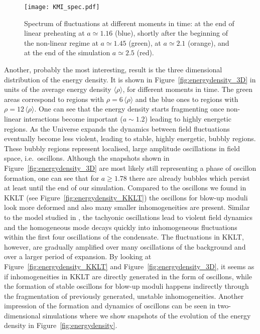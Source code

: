 \documentclass[12pt]{article}
\begin{document}
\begin{figure}
\begin{center}\texttt{[image: KMI\_spec.pdf]}
\end{center}
\caption{Spectrum of fluctuations at different moments in time: at the end of linear preheating at $a\simeq1.16$ (blue), shortly after the beginning of the non-linear regime at $a\simeq1.45$ (green), at $a\simeq2.1$ (orange), and at the end of the simulation $a\simeq2.5$ (red).}
\label{fig:KMI_spec}
\end{figure}

Another, probably the most interesting, result is the three dimensional distribution of the energy density. It is shown in Figure~\ref{fig:energydensity_3D} in units of the average energy density $\langle\rho\rangle$, for different moments in time. The green areas correspond to regions with $\rho = 6\,\langle\rho\rangle$ and the blue ones to regions with $\rho = 12\,\langle\rho\rangle$. One can see that the energy density starts fragmenting once non-linear interactions become important ($a\sim1.2$) leading to highly energetic regions. As the Universe expands the dynamics between field fluctuations eventually become less violent, leading to stable, highly energetic, bubbly regions. These bubbly regions represent localised, large amplitude oscillations in field space, i.e.\ oscillons. Although the snapshots shown in Figure~\ref{fig:energydensity_3D} are most likely still representing a phase of oscillon formation, one can see that for $a\ge1.78$ there are already bubbles which persist at least until the end of our simulation. 
Compared to the oscillons we found in KKLT (see Figure~\ref{fig:energydensity_KKLT}) the oscillons for blow-up moduli look more deformed and also many smaller inhomogeneities are present. Similar to the model studied in \cite{Antusch:2016con}, the tachyonic oscillations lead to violent field dynamics and the homogeneous mode decays quickly into inhomogeneous fluctuations within the first four oscillations of the condensate. 
The fluctuations in KKLT, however, are gradually amplified over many oscillations of the background and over a larger period of expansion. By looking at Figure~\ref{fig:energydensity_KKLT} and Figure~\ref{fig:energydensity_3D}, it seems as if inhomogeneities in KKLT are directly generated in the form of oscillons, while the formation of stable oscillons for blow-up moduli happens indirectly through the fragmentation of previously generated, unstable inhomogeneities.
Another impression of the formation and dynamics of oscillons can be seen in two-dimensional simulations where we show snapshots of the evolution of the energy density in Figure~\ref{fig:energydensity}.
\end{document}

